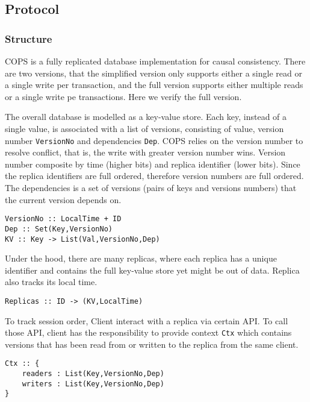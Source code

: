 \subsection{Protocol}

\subsubsection{Structure}
COPS is a fully replicated database implementation for causal consistency.
There are two versions, 
that the simplified version only supports either a single read or a single write per transaction, 
and the full version supports either multiple reads or a single write pe transactions.
Here we verify the full version.

The overall database is modelled as a key-value store.
Each key, instead of a single value, is associated with a list of versions,
consisting of value, version number \verb|VersionNo| and dependencies \verb|Dep|.
COPS relies on the version number to resolve conflict,
that is, the write with greater version number wins.
Version number composite by time (higher bits) and replica identifier (lower bits).
Since the replica identifiers are full ordered, therefore version numbers are full ordered.
The dependencies is a set of versions (pairs of keys and versions numbers)
that the current version depends on.

\begin{lstlisting}[caption={COPS Structure},label={lst:cops-structure}]
VersionNo :: LocalTime + ID
Dep :: Set(Key,VersionNo)
KV :: Key -> List(Val,VersionNo,Dep)
\end{lstlisting}

Under the hood, there are many replicas,
where each replica has a unique identifier
and contains the full key-value store yet might be out of data.
Replica also tracks its local time.

\begin{lstlisting}[caption={COPS Replicas},label={lst:cops-replica}]
Replicas :: ID -> (KV,LocalTime)
\end{lstlisting}

To track session order, Client interact with a replica via certain API.
To call those API,
client has the responsibility to provide context \verb|Ctx| 
which contains versions that has been read from or written to the replica from the same client.

\begin{lstlisting}[caption={Client context},label={lst:cops-client-ctx}]
Ctx :: {
    readers : List(Key,VersionNo,Dep)
    writers : List(Key,VersionNo,Dep)
}
\end{lstlisting}

